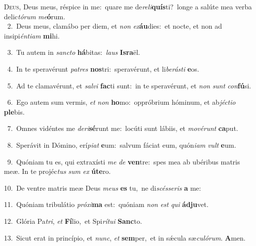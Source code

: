 \lettrine{\initial\textcolor{\initialcolor}{D}}{eus,} Deus meus, réspice in me:~\dagger quare me de\-\textit{re}\-\textit{li}\textbf{quís}ti?~\star longe a salúte mea verba delic\-\textit{tó}\-\textit{rum} \textit{me}\-\textbf{ó}rum.\\
{\numbfont\textcolor{\numbcolor}{~2.}}~Deus meus, clamábo per diem, et \textit{non} \textit{ex}\-\textbf{áu}dies:~\star et nocte, et non ad insipi\-\textit{én}\-\textit{ti}\textit{am} \textbf{mi}\-hi.\par
{\numbfont\textcolor{\numbcolor}{~3.}}~Tu autem in \textit{sanc}\-\textit{to} \textbf{há}\-bitas:~\star \textit{laus} \textbf{Is}\-\textbf{ra}ël.\par
{\numbfont\textcolor{\numbcolor}{~4.}}~In te speravérunt \textit{pa}\-\textit{tres} \textbf{nos}\-tri:~\star speravérunt, et li\-\textit{be}\-\textit{rás}\textit{ti} \textbf{e}\-os.\par
{\numbfont\textcolor{\numbcolor}{~5.}}~Ad te clamavérunt, et \textit{sal}\-\textit{vi} \textbf{fac}\-ti sunt:~\star in te speravérunt, et \textit{non} \textit{sunt} \textit{con}\-\textbf{fú}si.\par
{\numbfont\textcolor{\numbcolor}{~6.}}~Ego autem sum vermis, \textit{et} \textit{non} \textbf{ho}\-mo:~\star oppróbrium hóminum, et ab\-\textit{jéc}\-\textit{ti}\textit{o} \textbf{ple}\-bis.\par
{\numbfont\textcolor{\numbcolor}{~7.}}~Omnes vidéntes me \textit{de}\-\textit{ri}\textbf{sé}runt me:~\star locúti sunt lábiis, et \textit{mo}\-\textit{vé}\textit{runt} \textbf{ca}\-put.\par
{\numbfont\textcolor{\numbcolor}{~8.}}~Sperávit in Dómino, erí\-\textit{pi}\-\textit{at} \textbf{e}\-um:~\star salvum fáciat eum, quón\-\textit{i}\-\textit{am} \textit{vult} \textbf{e}\-um.\par
{\numbfont\textcolor{\numbcolor}{~9.}}~Quóniam tu es, qui extraxísti \textit{me} \textit{de} \textbf{ven}\-tre:~\star spes mea ab ubéribus matris meæ. In te projéc\textit{tus} \textit{sum} \textit{ex} \textbf{ú}\-\textbf{te}ro.\par
{\numbfont\textcolor{\numbcolor}{10.}}~De ventre matris meæ Deus \textit{me}\-\textit{us} \textbf{es} tu,~\star ne di\-\textit{scés}\-\textit{se}\textit{ris} \textbf{a} me:\par
{\numbfont\textcolor{\numbcolor}{11.}}~Quóniam tribulátio \textit{pró}\-\textit{xi}\textbf{ma} est:~\star quóniam \textit{non} \textit{est} \textit{qui} \textbf{ád}\-\textbf{ju}vet.\par
{\numbfont\textcolor{\numbcolor}{12.}}~Glória Pa\-\textit{tri}\-, \textit{et} \textbf{Fí}\-lio,~\star et Spi\-\textit{rí}\-\textit{tu}\textit{i} \textbf{Sanc}\-to.\par
{\numbfont\textcolor{\numbcolor}{13.}}~Sicut erat in princípio, et \textit{nunc}\-, \textit{et} \textbf{sem}\-per,~\star et in sǽcula sæ\-\textit{cu}\-\textit{ló}\textit{rum}. \textbf{A}\-men.\par
